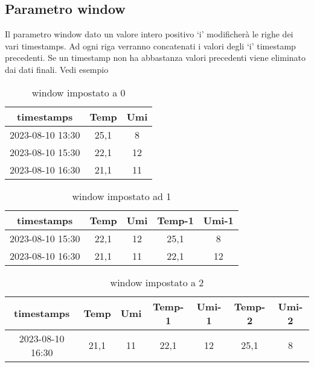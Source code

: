 \documentclass[a4paper,10pt]{article}
\begin{document}
\subsection{Parametro window}

Il parametro window dato un valore intero positivo `i' modificherà le righe dei vari timestamps. Ad ogni riga verranno concatenati i valori degli `i' timestamp precedenti.
Se un timestamp non ha abbastanza valori precedenti viene eliminato dai dati finali.
Vedi esempio

\begin{table}[h]
  \begin{tabular}{|*{3}{c|}}
  
  \hline
  timestamps & Temp & Umi\\
  \hline
  2023-08-10 13:30 & 25,1 & 8\\
  \hline
  2023-08-10 15:30 & 22,1 & 12\\
  \hline
  2023-08-10 16:30 & 21,1 & 11\\
  \hline
  
  \end{tabular}
  
  \caption{window impostato a 0}
\end{table}


\begin{table}[h]
  \begin{tabular}{|*{5}{c|}}
  
  \hline
  timestamps & Temp & Umi & Temp-1 & Umi-1\\
  \hline
  2023-08-10 15:30 & 22,1 & 12 & 25,1 & 8\\
  \hline
  2023-08-10 16:30 & 21,1 & 11 & 22,1 & 12\\
  \hline
  
  \end{tabular}
  
  \caption{window impostato ad 1}
\end{table}


\begin{table}[H]
  \begin{tabular}{|*{7}{c|}}
  \hline
  timestamps & Temp & Umi & Temp-1 & Umi-1 & Temp-2 & Umi-2\\
  \hline
  2023-08-10 16:30 & 21,1 & 11 & 22,1 & 12 & 25,1 & 8\\
  \hline
  
  \end{tabular}
  
  \caption{window impostato a 2}
\end{table}
\end{document}
